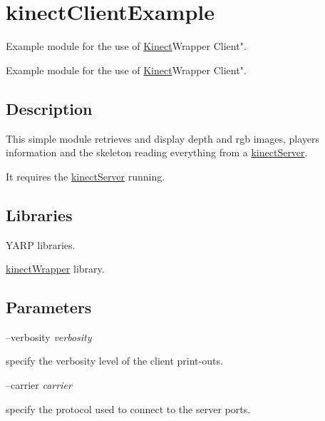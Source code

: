 \section{kinect\+Client\+Example}
\label{group__kinectClientExample}


Example module for the use of \hyperlink{group__kinectClientExample}{Kinect}Wrapper Client".  


Example module for the use of \hyperlink{group__kinectClientExample}{Kinect}Wrapper Client". 

\hypertarget{group__kinectServer_intro_sec}{}\subsection{Description}\label{group__kinectServer_intro_sec}
This simple module retrieves and display depth and rgb images, players information and the skeleton reading everything from a \hyperlink{group__kinectServer}{kinect\+Server}.

It requires the \hyperlink{group__kinectServer}{kinect\+Server} running.\hypertarget{group__kinectServer_lib_sec}{}\subsection{Libraries}\label{group__kinectServer_lib_sec}

\begin{DoxyItemize}
\item Y\+A\+RP libraries.
\item \hyperlink{group__kinectWrapper}{kinect\+Wrapper} library.
\end{DoxyItemize}\hypertarget{group__kinectServer_parameters_sec}{}\subsection{Parameters}\label{group__kinectServer_parameters_sec}
--verbosity {\itshape verbosity} 
\begin{DoxyItemize}
\item specify the verbosity level of the client print-\/outs.
\end{DoxyItemize}

--carrier {\itshape carrier} 
\begin{DoxyItemize}
\item specify the protocol used to connect to the server ports.
\end{DoxyItemize}

